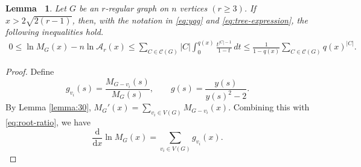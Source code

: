 \documentclass[11pt, a4paper]{article}
\theoremstyle{plain}
\newtheorem{lemma}{Lemma\ }[section]
\begin{document}
\begin{lemma}\label{lemma:matching-excess}
Let $G$ be an $r$-regular graph on $n$ vertices $(r\geq3)$. If $x>2\sqrt{2(r-1)}$,
then, with the notation in \eqref{eq:yqg} and \eqref{eq:tree-expression}, the following inequalities hold.
\begin{align}
 0\leq\ln M_G(x)-n\ln\mathcal{A}_r(x)
 \leq\sum_{C\in\mathcal{C}(G)}
    |C|\int_0^{q(x)}\frac{t^{|C|-1}}{1-t}\, dt
 \leq\frac1{1-q(x)}\sum_{C\in\mathcal{C}(G)}q(x)^{|C|}. \label{eq:matching-excess}
\end{align}
\end{lemma}
\begin{proof}
Define
\[
g_{v_i}(s)=\frac{M_{G-v_i}(s)}{M_G(s)},
\qquad
g(s)=\frac{y(s)}{y(s)^2-2}.
\]
By Lemma \ref{lemma:30},
$M_G'(x)=\sum_{v_i\in V(G)}M_{G-v_i}(x)$.
Combining this with \eqref{eq:root-ratio}, we have
\begin{equation}\label{eq:matching-log-derivative}
\frac{\mathrm{d}}{\mathrm{d}x} \ln M_G(x) = \sum_{v_i \in V(G)} g_{v_i}(x).
\end{equation}


\end{proof}
\end{document}
